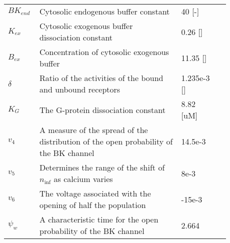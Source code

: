 \begin{table}[h!]
	\centering
	\begin{tabular}{| p{0.09\linewidth} | >{\footnotesize} p{0.6\linewidth} | >{\footnotesize} p{0.17\linewidth} | >{\footnotesize} p{0.02\linewidth} |}
		\arrayrulecolor{lightgrey}\hline

		$BK_{end}$      & Cytosolic endogenous buffer constant                              & 40 [-] & \cite{LoesEvert} \\
		$K_{ex}$        & Cytosolic exogenous buffer dissociation constant                  & 0.26 [\uM] & \cite{LoesEvert} \\
		$B_{ex}$        & Concentration of cytosolic exogenous buffer                       & 11.35 [\uM] & \cite{LoesEvert} \\
		$\delta$        & Ratio of the activities of the bound and unbound receptors        & 1.235e-3 [\uM] & \cite{LoesEvert}\\
		$K_G$           & The G-protein dissociation constant                               & 8.82  [uM] & \cite{LoesEvert}\\
		$v_{4}$			& A measure of the spread of the distribution of the open probability of the BK channel	& 14.5e-3 \Volt   &  \cite{Gonzalez1994}  
		\\
		$v_{5}$			& Determines the range of the shift of $n_\inf$ as calcium varies    		& 8e-3 \Volt  & \cite{LoesEvert}  \\
		$v_{6}$			& The voltage associated with the opening of half the population		& -15e-3 \Volt  & \cite{LoesEvert}  \\
		$ \psi_{w}$    	& A characteristic time for the open probability of the BK channel		& 2.664 \pers & \cite{Gonzalez1994} \\
		
		\hline
	\end{tabular}
\end{table}
